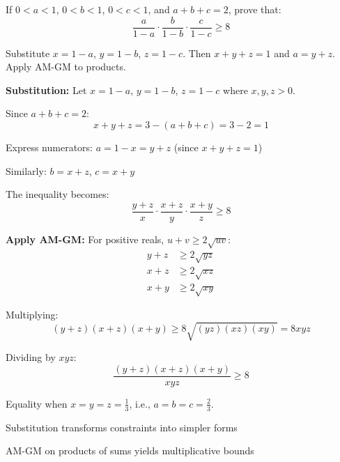 \begin{problem}
If $0 < a < 1$, $0 < b < 1$, $0 < c < 1$, and $a + b + c = 2$, prove that:
\[ \frac{a}{1-a} \cdot \frac{b}{1-b} \cdot \frac{c}{1-c} \ge 8 \]
\end{problem}

\begin{hint}
Substitute $x = 1-a$, $y = 1-b$, $z = 1-c$. Then $x+y+z = 1$ and $a = y+z$. Apply AM-GM to products.
\end{hint}

\begin{solution}
\textbf{Substitution:} Let $x = 1-a$, $y = 1-b$, $z = 1-c$ where $x,y,z > 0$.

Since $a+b+c = 2$:
\[ x+y+z = 3-(a+b+c) = 3-2 = 1 \]

Express numerators: $a = 1-x = y+z$ (since $x+y+z=1$)

Similarly: $b = x+z$, $c = x+y$

The inequality becomes:
\[ \frac{y+z}{x} \cdot \frac{x+z}{y} \cdot \frac{x+y}{z} \ge 8 \]

\textbf{Apply AM-GM:} For positive reals, $u+v \ge 2\sqrt{uv}$:
\begin{align*}
y+z &\ge 2\sqrt{yz} \\
x+z &\ge 2\sqrt{xz} \\
x+y &\ge 2\sqrt{xy}
\end{align*}

Multiplying:
\[ (y+z)(x+z)(x+y) \ge 8\sqrt{(yz)(xz)(xy)} = 8xyz \]

Dividing by $xyz$:
\[ \frac{(y+z)(x+z)(x+y)}{xyz} \ge 8 \]

Equality when $x=y=z=\frac{1}{3}$, i.e., $a=b=c=\frac{2}{3}$.
\end{solution}

\begin{takeaways}

\item Substitution transforms constraints into simpler forms
\item AM-GM on products of sums yields multiplicative bounds

\end{takeaways}
